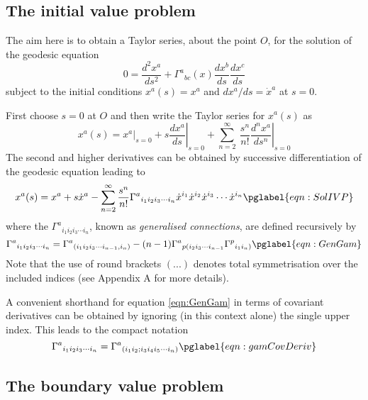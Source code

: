 \documentclass[a4paper,12pt]{article}
\numberwithin{equation}{section}
\begin{document}
\subsection{The initial value problem}\label{sub:CoordsIVP}

The aim here is to obtain a Taylor series, about the point $O$, for the solution of the
geodesic equation
\[
0 = \frac{d^2x^a}{ds^2} + \Gamma^a{}_{bc}(x) \frac{dx^b}{ds}\frac{dx^c}{ds}
\]
subject to the initial conditions $x^a(s) = x^a$ and $dx^a/ds={\Dot x}^a$ at $s=0$.

First choose $s=0$ at $O$ and then write the Taylor series for $x^a(s)$ as
\[
x^a(s) = \left.x^a\right\vert_{s=0}
       + s \left.\frac{dx^a}{ds}\right\vert_{s=0}
       + \sum_{n=2}^\infty\> \frac{s^n}{n!}\left.\frac{d^nx^a}{ds^n}\right\vert_{s=0}
\]
The second and higher derivatives can be obtained by successive differentiation of the
geodesic equation leading to
\begin{equation}
x^a(s) = x^a + s {\Dot x}^a
       - \sum_{n=2}^\infty \frac{s^n}{n!}\Gamma^{a}{}_{i_1i_2i_3\cdots i_n}
                                         {\Dot x}^{i_1}
                                         {\Dot x}^{i_2}
                                         {\Dot x}^{i_3}\cdots
                                         {\Dot x}^{i_n}
\pglabel{eqn:SolIVP}
\end{equation}
where the $\Gamma^{a}{}_{i_1i_2i_3\cdots i_n}$, known as \emph{generalised connections},
are defined recursively by
\begin{equation}
  \Gamma^{a}{}_{i_1i_2i_3\cdots i_n}
= \Gamma^{a}{}_{(i_1i_2i_3\cdots i_{n-1},i_n)}
      - (n-1) \Gamma^{a}{}_{p(i_2i_3\cdots i_{n-1}}
              \Gamma^{p}{}_{i_1i_n)}
\pglabel{eqn:GenGam}
\end{equation}
Note that the use of round brackets $(...)$ denotes total symmetrisation over the included
indices (see Appendix A for more details).

A convenient shorthand for equation \eqref{eqn:GenGam} in terms of covariant derivatives can
be obtained by ignoring (in this context alone) the single upper index. This leads to the
compact notation
\begin{equation}
\Gamma^{a}{}_{i_1i_2i_3\cdots i_n} = \Gamma^{a}{}_{(i_1i_2;i_3i_4i_5\cdots i_n)}
\pglabel{eqn:gamCovDeriv}
\end{equation}

\subsection{The boundary value problem}\label{sub:CoordsBVP}
\end{document}

